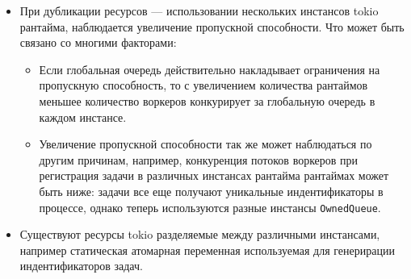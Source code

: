 \begin{itemize}
    \item При дубликации ресурсов --- использовании нескольких инстансов tokio рантайма, наблюдается увеличение пропускной способности. Что может быть связано со многими факторами:
    \begin{itemize}
        \item Если глобальная очередь действительно накладывает ограничения на пропускную способность, то с увеличением количества рантаймов меньшее количество воркеров конкурирует за глобальную очередь в каждом инстансе.
        \item Увеличение пропускной способности так же может наблюдаться по другим причинам, например, конкуренция потоков воркеров при регистрация задачи в различных инстансах рантайма рантаймах может быть ниже: задачи все еще получают уникальные индентификаторы в процессе, однако теперь используются разные инстансы \verb|OwnedQueue|.
    \end{itemize}
    \item Существуют ресурсы tokio разделяемые между различными инстансами, например статическая атомарная переменная используемая для генерирации индентификаторов задач.
\end{itemize}
